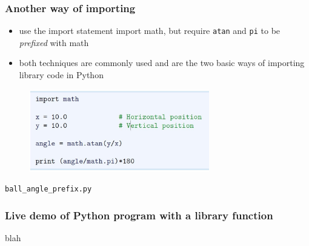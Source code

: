 \documentclass[14pt]{beamer}
\newcommand\red[1]{{\color{red} #1}}
\begin{document}

\begin{frame}[fragile]
\frametitle{Another way of importing}
\begin{itemize}
\item use the import statement import math, but require \texttt{atan} and \texttt{pi} to be \red{\emph{prefixed}} with math
\item both techniques are commonly used and are the two basic ways of importing library code in Python
\end{itemize}
\begin{figure}[ht]
	\centering
	\includegraphics[width=0.7\textwidth]{figures/LLp14}
\end{figure}
\vspace*{-5mm}
\begin{center}
\texttt{ball\_angle\_prefix.py}
\end{center}

\end{frame}


\begin{frame}[fragile]
\frametitle{Live demo of Python program with a library function}
blah
\end{frame}

\end{document}
